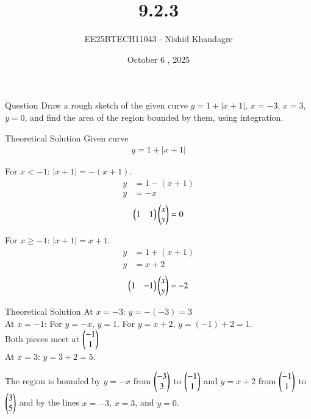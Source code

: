 \documentclass{beamer}
\title
{9.2.3}
\date{October 6 , 2025}
\author
{EE25BTECH11043 - Nishid Khandagre}
\begin{document}
\frame{\titlepage}

\begin{frame}{Question}
Draw a rough sketch of the given curve $y = 1 + |x + 1|$, $x = -3$, $x = 3$, $y = 0$, and
find the area of the region bounded by them, using integration.
\end{frame}

\begin{frame}{Theoretical Solution}
Given curve
\begin{align}
y = 1 + |x + 1|
\end{align}


For $x < -1$: $|x+1| = -(x+1)$.
    \begin{align}
        y &= 1 - (x+1) \\
        y &= -x
        \end{align}
        \begin{align}
        \begin{pmatrix}1&1\end{pmatrix}\begin{pmatrix}x\\y\end{pmatrix}=0
    \end{align}

     For $x \ge -1$: $|x+1| = x+1$.
    \begin{align}
        y &= 1 + (x+1) \\
        y &= x+2
        \end{align}
        \begin{align}
        \begin{pmatrix}1&-1\end{pmatrix}\begin{pmatrix}x\\y\end{pmatrix}=-2
    \end{align}
\end{frame}


\begin{frame}{Theoretical Solution}
At $x=-3$: $y = -(-3) = 3$\\
At $x=-1$: For $y=-x$, $y=1$. For $y=x+2$, $y=(-1)+2=1$.\\Both pieces meet at $\begin{pmatrix}-1\\1\end{pmatrix}$\\

At $x=3$: $y = 3+2 = 5$.



The region is bounded by $y = -x$ from $\begin{pmatrix}-3\\3\end{pmatrix}$ to $\begin{pmatrix}-1\\1\end{pmatrix}$ and $y = x+2$ from $\begin{pmatrix}-1\\1\end{pmatrix}$ to $\begin{pmatrix}3\\5\end{pmatrix}$ and by the lines $x=-3$, $x=3$, and $y=0$.
\end{frame}
\end{document}
